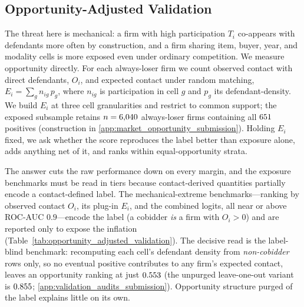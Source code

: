 \subsection{Opportunity-Adjusted Validation}
\label{sec:validation_exposure}
\label{sec:validation_exposure_timing}

The threat here is mechanical: a firm with high participation $T_i$
co-appears with defendants more often by construction, and a firm
sharing item, buyer, year, and modality cells is more exposed even
under ordinary competition. We measure opportunity directly. For
each always-loser firm we count observed contact with direct
defendants, $O_i$, and expected contact under random matching,
$E_i=\sum_g n_{ig}\,p_g$, where $n_{ig}$ is participation in cell
$g$ and $p_g$ its defendant-density. We build $E_i$ at three cell
granularities and restrict to common support; the exposed
subsample retains $n=6{,}040$ always-loser firms containing
all $651$ positives (construction in
\ref{app:market_opportunity_submission}). Holding $E_i$ fixed, we
ask whether the score reproduces the label better than exposure
alone, adds anything net of it, and ranks within equal-opportunity
strata.

The answer cuts the raw performance down on every margin, and the
exposure benchmarks must be read in tiers because contact-derived
quantities partially encode a contact-defined label. The
mechanical-extreme benchmarks---ranking by observed contact $O_i$,
its plug-in $E_i$, and the combined logits, all near or above
ROC-AUC $0.9$---encode the label (a cobidder \emph{is} a firm with
$O_i>0$) and are reported only to expose the inflation
(Table~\ref{tab:opportunity_adjusted_validation}). The decisive
read is the label-blind benchmark: recomputing each cell's defendant
density from \emph{non-cobidder} rows only, so no eventual positive
contributes to any firm's expected contact, leaves an opportunity
ranking at just $0.553$ (the unpurged leave-one-out variant
is $0.855$; \ref{app:validation_audits_submission}).
Opportunity structure purged of the label explains little on its own.

